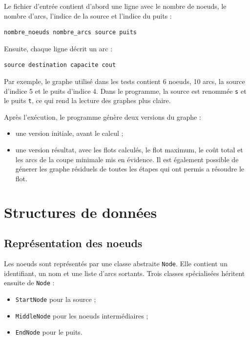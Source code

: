 \documentclass[11pt,a4paper]{article}
\begin{document}
Le fichier d'entrée contient d'abord une ligne avec le nombre de noeuds, le
nombre d'arcs, l'indice de la source et l'indice du puits :

\begin{lstlisting}
nombre_noeuds nombre_arcs source puits
\end{lstlisting}

Ensuite, chaque ligne décrit un arc :

\begin{lstlisting}
source destination capacite cout
\end{lstlisting}

Par exemple, le graphe utilisé dans les tests contient 6 noeuds, 10 arcs, la
source d'indice 5 et le puits d'indice 4. Dans le programme, la source est
renommée \texttt{s} et le puits \texttt{t}, ce qui rend la lecture des graphes
plus claire.

Après l'exécution, le programme génère deux versions du graphe :
\begin{itemize}
    \item une version initiale, avant le calcul ;
    \item une version résultat, avec les flots calculés, le flot maximum, le
    coût total et les arcs de la coupe minimale mis en évidence.
Il est également possible de génerer les graphe résiduels de toutes les étapes qui ont permis a résoudre le flot.
\end{itemize}

\section{Structures de données}

\subsection{Représentation des noeuds}

Les noeuds sont représentés par une classe abstraite \texttt{Node}. Elle contient
un identifiant, un nom et une liste d'arcs sortants. Trois classes spécialisées
héritent ensuite de \texttt{Node} :
\begin{itemize}
    \item \texttt{StartNode} pour la source ;
    \item \texttt{MiddleNode} pour les noeuds intermédiaires ;
    \item \texttt{EndNode} pour le puits.
\end{itemize}
\end{document}
